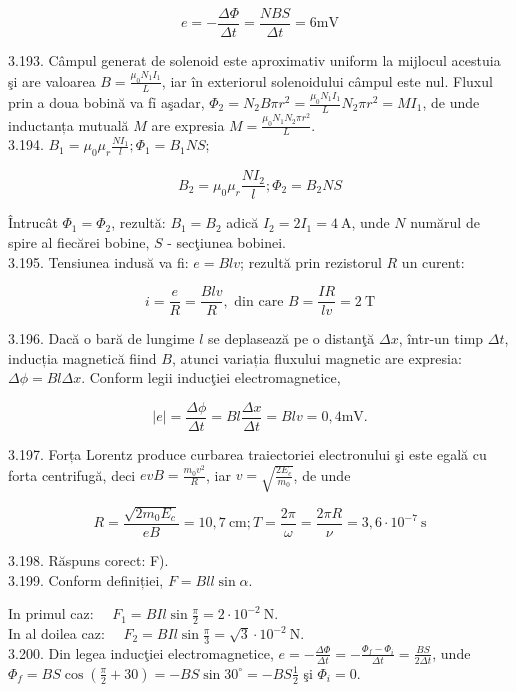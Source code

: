 \documentclass[10pt]{article}
\begin{document}
$$
e=-\frac{\Delta \Phi}{\Delta t}=\frac{N B S}{\Delta t}=6 \mathrm{mV}
$$

3.193. Câmpul generat de solenoid este aproximativ uniform la mijlocul acestuia şi are valoarea $B=\frac{\mu_{0} N_{1} I_{1}}{L}$, iar în exteriorul solenoidului câmpul este nul. Fluxul prin a doua bobină va fỉ aşadar, $\Phi_{2}=N_{2} B \pi r^{2}=\frac{\mu_{0} N_{1} I_{1}}{L} N_{2} \pi r^{2}=M I_{1}$, de unde inductanța mutuală $M$ are expresia $M=\frac{\mu_{0} N_{1} N_{2} \pi r^{2}}{L}$.\\
3.194. $B_{1}=\mu_{0} \mu_{r} \frac{N I_{1}}{l} ; \Phi_{1}=B_{1} N S$;

$$
B_{2}=\mu_{0} \mu_{r} \frac{N I_{2}}{l} ; \Phi_{2}=B_{2} N S
$$

Întrucât $\Phi_{1}=\Phi_{2}$, rezultă: $B_{1}=B_{2}$ adică $I_{2}=2 I_{1}=4 \mathrm{~A}$, unde $N$ numărul de spire al fiecărei bobine, $S$ - secţiunea bobinei.\\
3.195. Tensiunea indusă va fi: $e=B l v$; rezultă prin rezistorul $R$ un curent:

$$
i=\frac{e}{R}=\frac{B l v}{R}, \text { din care } B=\frac{I R}{l v}=2 \mathrm{~T}
$$

3.196. Dacă o bară de lungime $l$ se deplasează pe o distanţă $\Delta x$, într-un timp $\Delta t$, inducția magnetică fiind $B$, atunci variația fluxului magnetic are expresia: $\Delta \phi=B l \Delta x$. Conform legii inducţiei electromagnetice,

$$
|e|=\frac{\Delta \phi}{\Delta t}=B l \frac{\Delta x}{\Delta t}=B l v=0,4 \mathrm{mV} .
$$

3.197. Forța Lorentz produce curbarea traiectoriei electronului şi este egală cu forta centrifugă, deci $e v B=\frac{m_{0} v^{2}}{R}$, iar $v=\sqrt{\frac{2 E_{c}}{m_{0}}}$, de unde

$$
R=\frac{\sqrt{2 m_{0} E_{c}}}{e B}=10,7 \mathrm{~cm} ; T=\frac{2 \pi}{\omega}=\frac{2 \pi R}{\nu}=3,6 \cdot 10^{-7} \mathrm{~s}
$$

3.198. Răspuns corect: F).\\
3.199. Conform definiției, $F=B l l \sin \alpha$.

In primul caz: $\quad F_{1}=B I l \sin \frac{\pi}{2}=2 \cdot 10^{-2} \mathrm{~N}$.\\
In al doilea caz: $\quad F_{2}=B I l \sin \frac{\pi}{3}=\sqrt{3} \cdot 10^{-2} \mathrm{~N}$.\\
3.200. Din legea inducţiei electromagnetice, $e=-\frac{\Delta \Phi}{\Delta t}=-\frac{\Phi_{f}-\Phi_{i}}{\Delta t}=\frac{B S}{2 \Delta t}$, unde $\Phi_{f}=B S \cos \left(\frac{\pi}{2}+30\right)=-B S \sin 30^{\circ}=-B S \frac{1}{2}$ şi $\Phi_{i}=0$.
\end{document}

